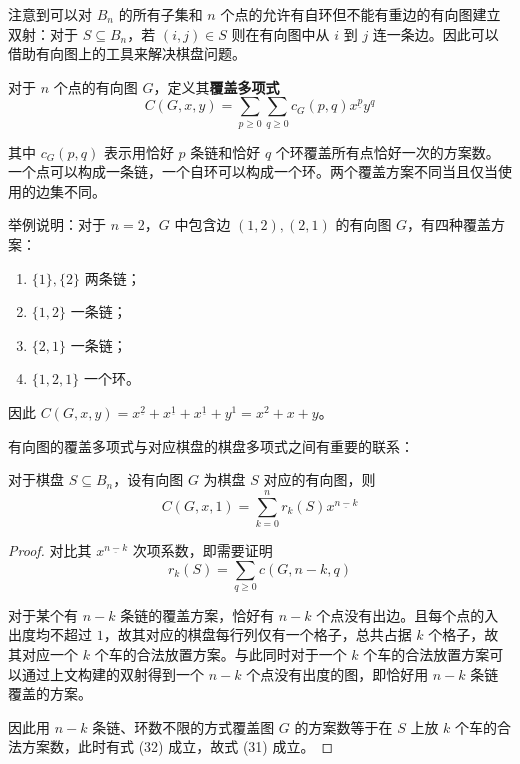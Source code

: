 \documentclass{noithesis}
\begin{document}
	注意到可以对 $B_n$ 的所有子集和 $n$ 个点的允许有自环但不能有重边的有向图建立双射：对于 $S \subseteq B_n$，若 $(i,j) \in S$ 则在有向图中从 $i$ 到 $j$ 连一条边。因此可以借助有向图上的工具来解决棋盘问题。
	
	\begin{definition}
		对于 $n$ 个点的有向图 $G$，定义其\textbf{覆盖多项式}\begin{equation}
		C(G,x,y) = \sum_{p \geq 0} \sum_{q \geq 0} c_G(p,q) x^{\underline p}y^q
		\end{equation}
		
		其中 $c_G(p,q)$ 表示用恰好 $p$ 条链和恰好 $q$ 个环覆盖所有点恰好一次的方案数。一个点可以构成一条链，一个自环可以构成一个环。两个覆盖方案不同当且仅当使用的边集不同。
	\end{definition}
	
	举例说明：对于 $n=2$，$G$ 中包含边 $(1,2),(2,1)$ 的有向图 $G$，有四种覆盖方案：
	\begin{enumerate}
		\item $\{1\},\{2\}$ 两条链；
		\item $\{1,2\}$ 一条链；
		\item $\{2,1\}$ 一条链；
		\item $\{1,2,1\}$ 一个环。
	\end{enumerate}

	因此 $C(G,x,y) = x^{\underline 2}+x^{\underline 1}+x^{\underline 1}+y^1 = x^2+x+y$。
	
	有向图的覆盖多项式与对应棋盘的棋盘多项式之间有重要的联系：
	\begin{theorem}[\cite{1995On}]\label{cover=xiajiangmi}
		对于棋盘 $S \subseteq B_n$，设有向图 $G$ 为棋盘 $S$ 对应的有向图，则
		\begin{equation}
		C(G,x,1) = \sum_{k=0}^n r_k(S)x^{\underline{n-k}}
		\end{equation}
	\end{theorem}
	\begin{proof}
		对比其 $x^{\underline {n-k}}$ 次项系数，即需要证明 \begin{equation}
		r_k(S) = \sum_{q \geq 0} c(G,n-k,q)
		\end{equation}
		
		对于某个有 $n-k$ 条链的覆盖方案，恰好有 $n-k$ 个点没有出边。且每个点的入出度均不超过 $1$，故其对应的棋盘每行列仅有一个格子，总共占据 $k$ 个格子，故其对应一个 $k$ 个车的合法放置方案。与此同时对于一个 $k$ 个车的合法放置方案可以通过上文构建的双射得到一个 $n-k$ 个点没有出度的图，即恰好用 $n-k$ 条链覆盖的方案。
		
		因此用 $n-k$ 条链、环数不限的方式覆盖图 $G$ 的方案数等于在 $S$ 上放 $k$ 个车的合法方案数，此时有式 (32) 成立，故式 (31) 成立。
	\end{proof}
	
\end{document}
